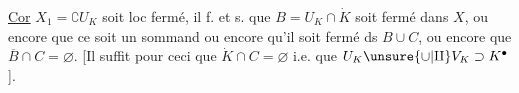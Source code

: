 \uline{Cor}    $X_1=\complement U_K$ soit loc fermé, il f. et s. que $B=U_K\cap\dot K$ soit    fermé dans $X$, ou encore que ce soit un sommand    ou encore qu'il soit fermé ds $B\cup C$, ou encore que $\overline B\cap C=\varnothing$. [Il suffit pour ceci que $\dot K\cap C=\varnothing$ i.e. que $U_K\unsure{\cup|\amalg}V_K\supset K^{\bullet}$]. 
